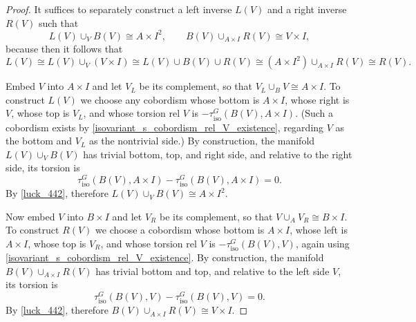 \documentclass[11pt]{amsart}
\theoremstyle{definition}
\numberwithin{equation}{section}
\numberwithin{figure}{section}
\newcommand{\R}{\mathbb R}
\newcommand{\iso}{\mathrm{iso}}
\newcommand{\St}{\mathrm{St}}
\begin{document}
\begin{proof}
	It suffices to separately construct a left inverse $L(V)$ and a right inverse $R(V)$ such that
	\[ L(V) \cup_V B(V) \cong A \times I^2, \qquad B(V) \cup_{A \times I} R(V) \cong V \times I, \]
	because then it follows that
	\[ L(V) \cong L(V) \cup_V (V \times I) \cong L(V) \cup B(V) \cup R(V) \cong (A \times I^2) \cup_{A \times I} R(V) \cong R(V). \]
	
	Embed $V$ into $A \times I$ and let $V_L$ be its complement, so that $V_L \cup_B V \cong A \times I$. To construct $L(V)$ we choose any cobordism whose bottom is $A \times I$, whose right is $V$, whose top is $V_L$, and whose torsion rel $V$ is $-\tau^G_{\iso}(B(V),A \times I)$. (Such a cobordism exists by \autoref{isovariant_s_cobordism_rel_V_existence}, regarding $V$ as the bottom and $V_L$ as the nontrivial side.) By construction, the manifold $L(V) \cup_V B(V)$ has trivial bottom, top, and right side, and relative to the right side, its torsion is
	\[ \tau^G_{\iso}(B(V),A \times I) - \tau^G_{\iso}(B(V),A \times I) = 0. \]
	By \autoref{luck_442}, therefore $L(V) \cup_V B(V) \cong A \times I^2$.
	
	
	Now embed $V$ into $B \times I$ and let $V_R$ be its complement, so that $V \cup_A V_R \cong B \times I$. To construct $R(V)$ we choose a cobordism whose bottom is $A \times I$, whose left is $A \times I$, whose top is $V_R$, and whose torsion rel $V$ is $-\tau^G_{\iso}(B(V),V)$, again using \autoref{isovariant_s_cobordism_rel_V_existence}. By construction, the manifold $B(V) \cup_{A \times I} R(V)$ has trivial bottom and top, and relative to the left side $V$, its torsion is
	\[ \tau^G_{\iso}(B(V),V) - \tau^G_{\iso}(B(V),V) = 0. \]
	By \autoref{luck_442}, therefore $B(V) \cup_{A \times I} R(V) \cong V \times I$.
\end{proof}
\end{document}
